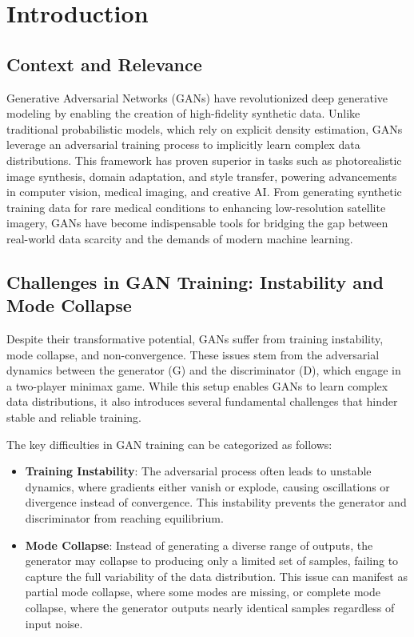 \chapter*{Introduction}

\section*{Context and Relevance}
Generative Adversarial Networks (GANs) have revolutionized deep generative modeling by enabling the creation of high-fidelity synthetic data. Unlike traditional probabilistic models, which rely on explicit density estimation, GANs leverage an adversarial training process to implicitly learn complex data distributions. This framework has proven superior in tasks such as photorealistic image synthesis, domain adaptation, and style transfer, powering advancements in computer vision, medical imaging, and creative AI. From generating synthetic training data for rare medical conditions to enhancing low-resolution satellite imagery, GANs have become indispensable tools for bridging the gap between real-world data scarcity and the demands of modern machine learning.

\section*{Challenges in GAN Training: Instability and Mode Collapse}
Despite their transformative potential, GANs suffer from training instability, mode collapse, and non-convergence. These issues stem from the adversarial dynamics between the generator (G) and the discriminator (D), which engage in a two-player minimax game. While this setup enables GANs to learn complex data distributions, it also introduces several fundamental challenges that hinder stable and reliable training.

The key difficulties in GAN training can be categorized as follows:
\begin{itemize}  
    \item \textbf{Training Instability}: The adversarial process often leads to unstable dynamics, where gradients either vanish or explode, causing oscillations or divergence instead of convergence. This instability prevents the generator and discriminator from reaching equilibrium.  
    \item \textbf{Mode Collapse}: Instead of generating a diverse range of outputs, the generator may collapse to producing only a limited set of samples, failing to capture the full variability of the data distribution. This issue can manifest as partial mode collapse, where some modes are missing, or complete mode collapse, where the generator outputs nearly identical samples regardless of input noise.  
    
\end{itemize}  


